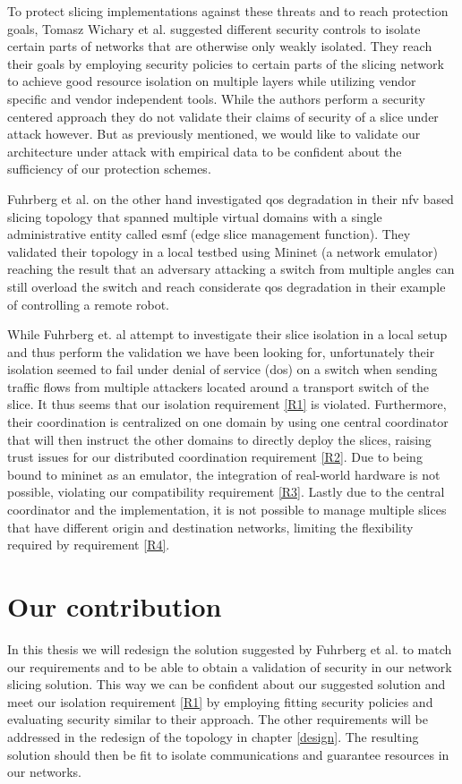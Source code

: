 To protect slicing implementations against these threats and to reach protection goals, Tomasz Wichary et al. \cite{SE3} suggested different security controls to isolate certain parts of networks that are otherwise only weakly isolated. They reach their goals by employing security policies to certain parts of the slicing network to achieve good resource isolation on multiple layers while utilizing vendor specific and vendor independent tools. While the authors perform a security centered approach they do not validate their claims of security of a slice under attack however. But as previously mentioned, we would like to validate our architecture under attack with empirical data to be confident about the sufficiency of our protection schemes.

Fuhrberg et al. \cite{SE4} on the other hand investigated \acrshort{qos} degradation in their \acrshort{nfv} based slicing topology that spanned multiple virtual domains with a single administrative entity called \acrshort{esmf} (edge slice management function). They validated their topology in a local testbed using Mininet \cite{mininet} (a network emulator) reaching the result that an adversary attacking a switch from multiple angles can still overload the switch and reach considerate \acrshort{qos} degradation in their example of controlling a remote robot.

While Fuhrberg et. al \cite{SE4} attempt to investigate their slice isolation in a local setup and thus perform the validation we have been looking for, unfortunately their isolation seemed to fail under denial of service (\acrshort{dos}) on a switch when sending traffic flows from multiple attackers located around a transport switch of the slice. It thus seems that our isolation requirement \ref{R1} is violated. Furthermore, their coordination is centralized on one domain by using one central coordinator that will then instruct the other domains to directly deploy the slices, raising trust issues for our distributed coordination requirement \ref{R2}. Due to being bound to mininet \cite{mininet} as an emulator, the integration of real-world hardware is not possible, violating our compatibility requirement \ref{R3}. Lastly due to the central coordinator and the implementation, it is not possible to manage multiple slices that have different origin and destination networks, limiting the flexibility required by requirement \ref{R4}.


\section{Our contribution}
In this thesis we will redesign the solution suggested by Fuhrberg et al. \cite{SE4} to match our requirements and to be able to obtain a validation of security in our network slicing solution. This way we can be confident about our suggested solution and meet our isolation requirement \ref{R1} by employing fitting security policies and evaluating security similar to their approach. The other requirements will be addressed in the redesign of the topology in chapter \ref{design}. The resulting solution should then be fit to isolate communications and guarantee resources in our networks.


